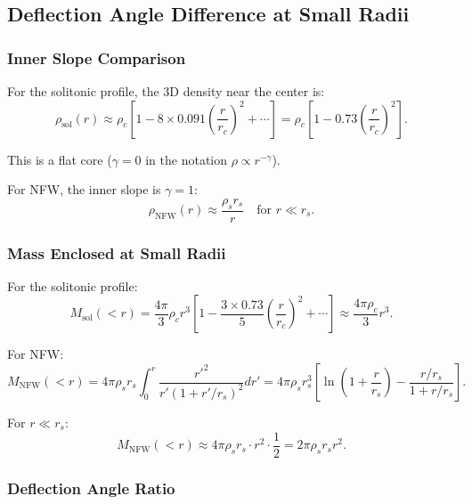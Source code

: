 \documentclass[11pt,a4paper]{article}
\theoremstyle{definition}
\theoremstyle{remark}
\begin{document}
\subsection{Deflection Angle Difference at Small Radii}
\label{sec:deflection_difference}

\subsubsection{Inner Slope Comparison}

For the solitonic profile, the 3D density near the center is:
\begin{equation}
\rho_{\mathrm{sol}}(r) \approx \rho_c \left[1 - 8 \times 0.091 \left(\frac{r}{r_c}\right)^2 + \cdots\right] = \rho_c \left[1 - 0.73 \left(\frac{r}{r_c}\right)^2\right].
\end{equation}

This is a flat core ($\gamma = 0$ in the notation $\rho \propto r^{-\gamma}$).

For NFW, the inner slope is $\gamma = 1$:
\begin{equation}
\rho_{\mathrm{NFW}}(r) \approx \frac{\rho_s r_s}{r} \quad \text{for } r \ll r_s.
\end{equation}

\subsubsection{Mass Enclosed at Small Radii}

For the solitonic profile:
\begin{equation}
M_{\mathrm{sol}}(<r) = \frac{4\pi}{3} \rho_c r^3 \left[1 - \frac{3 \times 0.73}{5}\left(\frac{r}{r_c}\right)^2 + \cdots\right] \approx \frac{4\pi \rho_c}{3} r^3.
\end{equation}

For NFW:
\begin{equation}
M_{\mathrm{NFW}}(<r) = 4\pi \rho_s r_s \int_0^r \frac{r'^2}{r'(1+r'/r_s)^2} dr' = 4\pi \rho_s r_s^3 \left[\ln\left(1 + \frac{r}{r_s}\right) - \frac{r/r_s}{1+r/r_s}\right].
\end{equation}

For $r \ll r_s$:
\begin{equation}
M_{\mathrm{NFW}}(<r) \approx 4\pi \rho_s r_s \cdot r^2 \cdot \frac{1}{2} = 2\pi \rho_s r_s r^2.
\end{equation}

\subsubsection{Deflection Angle Ratio}
\end{document}
